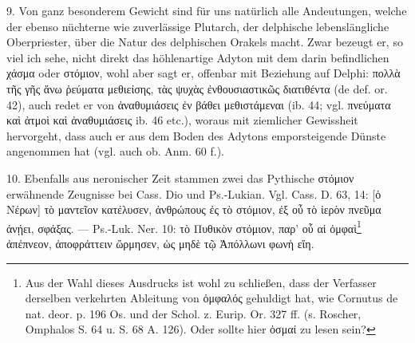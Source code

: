\documentclass[a4paper, 11pt, oneside]{article}
\begin{document}
9. Von ganz besonderem Gewicht sind für uns natürlich alle Andeutungen, welche der ebenso nüchterne wie zuverlässige Plutarch, der delphische lebenslängliche Oberpriester, über die Natur des delphischen Orakels macht. Zwar bezeugt er, so viel ich sehe, nicht direkt das höhlenartige Adyton mit dem darin befindlichen χάσμα oder στόμιον, wohl aber sagt er, offenbar mit Beziehung auf Delphi: πολλὰ τῆς γῆς ἄνω ῥεύματα μεθιείσης, τὰς ψυχὰς ἐνθουσιαστικῶς διατιθέντα (de def. or. 42), auch redet er von ἀναθυμιάσεις ἐν βάθει μεθιστάμεναι (ib. 44; vgl. πνεύματα καὶ ἀτμοὶ καὶ ἀναθυμιάσεις ib. 46 etc.), woraus mit ziemlicher Gewissheit hervorgeht, dass auch er aus dem Boden des Adytons emporsteigende Dünste angenommen hat (vgl. auch ob. Anm. 60 f.).

10. Ebenfalls aus neronischer Zeit stammen zwei das Pythische στόμιον erwähnende Zeugnisse bei Cass. Dio und Ps.-Lukian. Vgl. Cass. D. 63, 14: [ὁ Νέρων] τὸ μαντεῖον κατέλυσεν, ἀνθρώπους ἐς τὸ στόμιον, ἐξ οὗ τὸ ἱερὸν πνεῦμα ἀνῄει, σφάξας. --- Ps.-Luk. Ner. 10: τὸ Πυθικὸν στόμιον, παρ' οὗ αἱ ὀμφαὶ\footnote{Aus der Wahl dieses Ausdrucks ist wohl zu schließen, dass der Verfasser derselben verkehrten Ableitung von ὀμφαλός gehuldigt hat, wie Cornutus de nat. deor. p. 196 Os. und der Schol. z. Eurip. Or. 327 ff. (s. Roscher, Omphalos S. 64 u. S. 68 A. 126). Oder sollte hier ὀσμαί zu lesen sein?} ἀπέπνεον, ἀποφράττειν ὥρμησεν, ὡς μηδὲ τῷ Ἀπόλλωνι φωνὴ εἴη.
\end{document}
